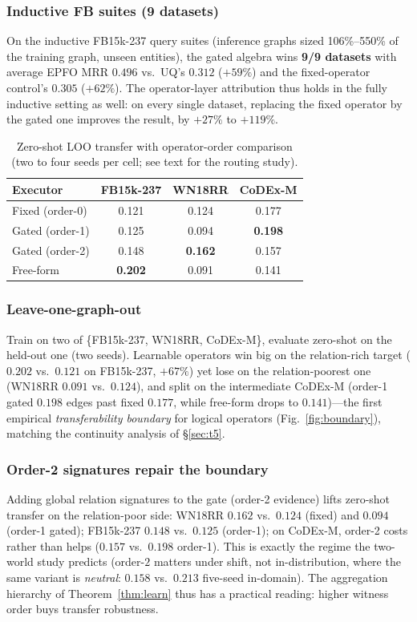 \documentclass[journal]{IEEEtran}
\begin{document}
\subsubsection{Inductive FB suites (9 datasets)} On the inductive
FB15k-237 query suites (inference graphs sized 106\%--550\% of the training
graph, unseen entities), the gated algebra wins \textbf{9/9 datasets} with
average EPFO MRR $0.496$ vs.\ UQ's $0.312$ ($+59\%$) and the fixed-operator
control's $0.305$ ($+62\%$). The operator-layer attribution thus holds in
the fully inductive setting as well: on every single dataset, replacing the
fixed operator by the gated one improves the result, by $+27\%$ to $+119\%$.

\begin{table}[t]
\centering
\caption{Zero-shot LOO transfer with operator-order comparison
(two to four seeds per cell; see text for the routing study).}
\label{tab:loo}
\small
\begin{tabular}{lccc}
\toprule
Executor & FB15k-237 & WN18RR & CoDEx-M \\
\midrule
Fixed (order-0) & 0.121 & 0.124 & 0.177 \\
Gated (order-1) & 0.125 & 0.094 & \textbf{0.198} \\
Gated (order-2) & 0.148 & \textbf{0.162} & 0.157 \\
Free-form & \textbf{0.202} & 0.091 & 0.141 \\
\bottomrule
\end{tabular}
\end{table}


\subsubsection{Leave-one-graph-out} Train on two of \{FB15k-237, WN18RR,
CoDEx-M\}, evaluate zero-shot on the held-out one (two seeds). Learnable
operators win big on the relation-rich target ($0.202$ vs.\ $0.121$ on
FB15k-237, $+67\%$) yet lose on the relation-poorest one (WN18RR
$0.091$ vs.\ $0.124$), and split on the intermediate CoDEx-M (order-1
gated $0.198$ edges past fixed $0.177$, while free-form drops to
$0.141$)---the first empirical
\emph{transferability boundary} for logical operators
(Fig.~\ref{fig:boundary}), matching the continuity analysis of
\S\ref{sec:t5}.

\subsubsection{Order-2 signatures repair the boundary} Adding global
relation signatures to the gate (order-2 evidence) lifts zero-shot
transfer on the relation-poor side: WN18RR $0.162$ vs.\ $0.124$
(fixed) and $0.094$ (order-1 gated); FB15k-237 $0.148$ vs.\ $0.125$
(order-1); on CoDEx-M, order-2 costs rather than helps ($0.157$ vs.\
$0.198$ order-1). This is exactly the regime the two-world study predicts
(order-$2$ matters under shift, not in-distribution, where the same
variant is \emph{neutral}: $0.158$ vs.\ $0.213$ five-seed in-domain).
The aggregation hierarchy of Theorem~\ref{thm:learn} thus has a
practical reading: higher witness order buys transfer robustness.
\end{document}
